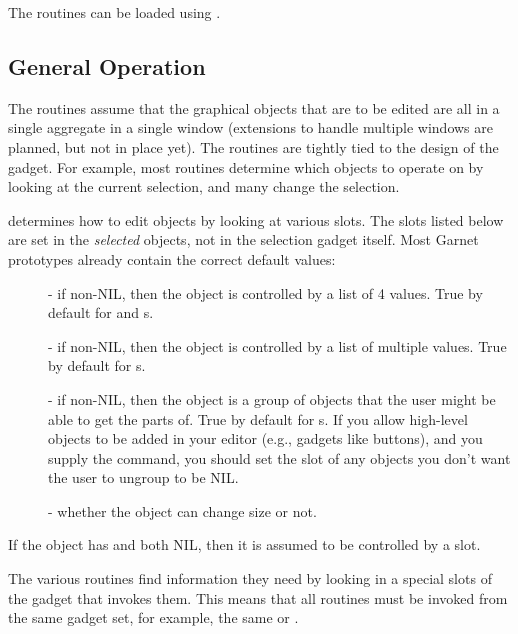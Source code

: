 The  routines can be loaded using
.

\subsection{General Operation}

The  routines assume that the graphical objects that
are to be edited are all in a single aggregate in a single window
(extensions to handle multiple windows are planned, but not in place
yet).  The routines are tightly tied to the design of the
 gadget.  For example, most routines
determine which objects to operate on by looking at the current
selection, and many change the selection.

 determines how to edit objects by
looking at various slots.  The slots listed below are set in the {\it selected}
objects, not in the selection gadget itself.  Most Garnet prototypes already
contain the correct default values:

\begin{description}
\item[]  - if non-NIL, then the object is controlled by a
 list of 4 values.  True by default for  and
s.

\item[]  -  if non-NIL, then the object is controlled by a
 list of multiple values.  True by default for
s.

\item[]  - if non-NIL, then the object is a group of objects that the
user might be able to get the parts of.  True by default for
s.  If you allow high-level objects to be added
in your editor (e.g., gadgets like buttons), and you supply the
 command, you should set the  slot
of any objects you don't want the user to ungroup to be NIL.

\item[]  - whether the object can change size or not.
\end{description}

If the object has  and  both NIL, then it
is assumed to be controlled by a  slot.

The various routines find information they need by looking in a
special slots of the gadget that invokes them.  This means that all
routines must be invoked from the same gadget set, for example, the
same  or .


